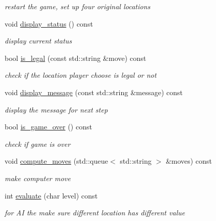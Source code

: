 \begin{DoxyCompactItemize}
\begin{DoxyCompactList}\small\item\em restart the game, set up four original locations \end{DoxyCompactList}\item 
void \hyperlink{classmain__savitch__14_1_1Othello_a471f0e8f0e63ed32d764682f60110267}{display\+\_\+status} () const 
\begin{DoxyCompactList}\small\item\em display current status \end{DoxyCompactList}\item 
bool \hyperlink{classmain__savitch__14_1_1Othello_af25b1502991e71e6bedbfa36a4006a8c}{is\+\_\+legal} (const std\+::string \&move) const 
\begin{DoxyCompactList}\small\item\em check if the location player choose is legal or not \end{DoxyCompactList}\item 
void \hyperlink{classmain__savitch__14_1_1Othello_a87ef083b9bc3943a0951f70c3ba9160a}{display\+\_\+message} (const std\+::string \&message) const 
\begin{DoxyCompactList}\small\item\em display the message for next step \end{DoxyCompactList}\item 
bool \hyperlink{classmain__savitch__14_1_1Othello_a4387d20f953aab54025760ec3f72f7ca}{is\+\_\+game\+\_\+over} () const 
\begin{DoxyCompactList}\small\item\em check if game is over \end{DoxyCompactList}\item 
void \hyperlink{classmain__savitch__14_1_1Othello_aae15562565348c574b8e4c0b7782d19f}{compute\+\_\+moves} (std\+::queue$<$ std\+::string $>$ \&moves) const 
\begin{DoxyCompactList}\small\item\em make computer move \end{DoxyCompactList}\item 
int \hyperlink{classmain__savitch__14_1_1Othello_aa5a29557cb041e963e53f077d7932e16}{evaluate} (char level) const 
\begin{DoxyCompactList}\small\item\em for AI the make sure different location has different value \end{DoxyCompactList}\item 

\end{DoxyCompactItemize}
